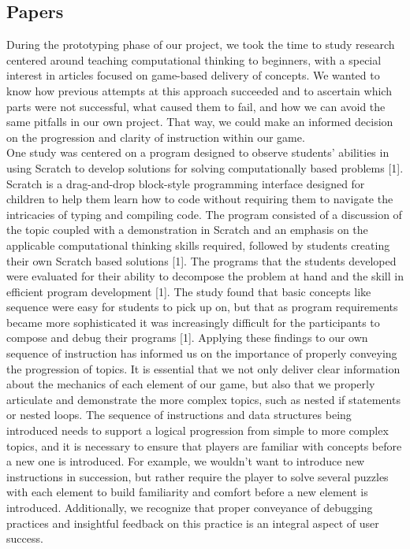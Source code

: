\documentclass{article}
\begin{document}
\subsection{Papers}
During the prototyping phase of our project, we took the time to study research
centered around teaching computational thinking to beginners, with a special
interest in articles focused on game-based delivery of concepts. We wanted to
know how previous attempts at this approach succeeded and to ascertain which
parts were not successful, what caused them to fail, and how we can avoid the
same pitfalls in our own project. That way, we could make an informed decision
on the progression and clarity of instruction within our game.\\

One study was centered on a program designed to observe students’ abilities in
using Scratch to develop solutions for solving computationally based problems
[1]. Scratch is a drag-and-drop block-style programming interface designed for
children to help them learn how to code without requiring them to navigate the
intricacies of typing and compiling code. The program consisted of a discussion
of the topic coupled with a demonstration in Scratch and an emphasis on the
applicable computational thinking skills required, followed by students creating
their own Scratch based solutions [1]. The programs that the students developed
were evaluated for their ability to decompose the problem at hand and the skill
in efficient program development [1]. The study found that basic concepts like
sequence were easy for students to pick up on, but that as program requirements
became more sophisticated it was increasingly difficult for the participants to
compose and debug their programs [1]. Applying these findings to our own
sequence of instruction has informed us on the importance of properly conveying
the progression of topics. It is essential that we not only deliver clear
information about the mechanics of each element of our game, but also that we
properly articulate and demonstrate the more complex topics, such as nested if
statements or nested loops. The sequence of instructions and data structures
being introduced needs to support a logical progression from simple to more
complex topics, and it is necessary to ensure that players are familiar with
concepts before a new one is introduced. For example, we wouldn’t want to
introduce new instructions in succession, but rather require the player to solve
several puzzles with each element to build familiarity and comfort before a new
element is introduced.  Additionally, we recognize that proper conveyance of
debugging practices and insightful feedback on this practice is an integral
aspect of user success.\\
\end{document}
